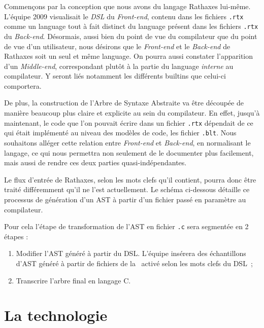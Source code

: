 \documentclass{rtxreport}
\begin{document}
\hbox{}
Commençons par la conception que nous avons du langage Rathaxes
lui-même. L'équipe 2009 visualisait le \emph{DSL} du \emph{Front-end},
contenu dans les fichiers \texttt{.rtx} comme un language tout à fait
distinct du language présent dans les fichiers \texttt{.rtx} du
\emph{Back-end}. Désormais, aussi bien du point de vue du compilateur que
du point de vue d'un utilisateur, nous désirons que le \emph{Front-end} et
le \emph{Back-end} de Rathaxes soit un seul et même language. On pourra
aussi constater l'apparition d'un \emph{Middle-end}, correspondant plutôt
à la partie du language \emph{interne} au compilateur. Y seront liés
notamment les différents builtins que celui-ci comportera.

\hbox{}
De plus, la construction de l'Arbre de Syntaxe Abstraite va être
découpée de manière beaucoup plus claire et explicite au sein du
compilateur.
En effet, jusqu'à maintenant, le code que l'on pouvait écrire dans un
fichier \texttt{.rtx} dépendait de ce qui était implémenté au
niveau des modèles de code, les fichier \texttt{.blt}. Nous souhaitons
alléger cette relation entre \emph{Front-end} et \emph{Back-end}, en
normalisant le langage, ce qui nous permettra non seulement de le documenter
plus facilement, mais aussi de rendre ces deux parties quasi-indépendantes.

Le flux d'entrée de Rathaxes, selon les mots clefs qu'il contient,
pourra donc être traité différemment qu'il ne l'est actuellement.
Le schéma ci-dessous détaille ce processus de génération d'un
AST à partir d'un fichier passé en paramètre au compilateur.

\hbox{}

\hbox{}
Pour cela l'étape de transformation de l'AST en fichier \texttt{.c} sera
segmentée en 2 étapes :
\begin{enumerate}
\item Modifier l'AST généré à partir du DSL. L'équipe insérera des échantillons
d'AST généré à partir de fichiers de la \BL\ activé selon les mots clefs du
DSL~;
\item Transcrire l'arbre final en langage C.
\end{enumerate}

\chapter{La technologie \rtx}
\end{document}
